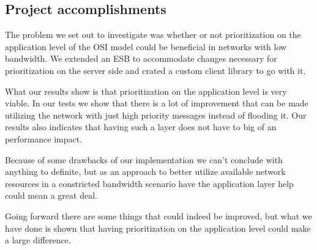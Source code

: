 \subsection{Project accomplishments}\label{Project accomplishments}
	The problem we set out to investigate was whether or not prioritization on the application level of the OSI model could be beneficial in networks with low bandwidth. We extended an ESB to accommodate changes necessary for prioritization on the server side and crated a custom client library to go with it.
	
	What our results show is that prioritization on the application level is very viable. In our tests we show that there is a lot of improvement that can be made utilizing the network with just high priority messages instead of flooding it. Our results also indicates that having such a layer does not have to big of an performance impact.
	
	Because of some drawbacks of our implementation we can't conclude with anything to definite, but as an approach to better utilize available network resources in a constricted bandwidth scenario have the application layer help could mean a great deal.
	
	Going forward there are some things that could indeed be improved, but what we have done is shown that having prioritization on the application level could make a large difference.
